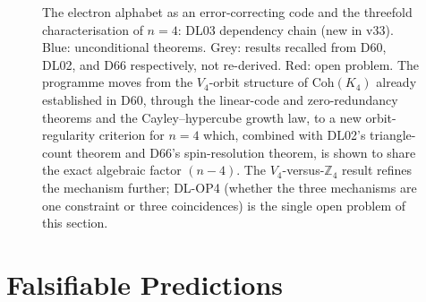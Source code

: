 \documentclass[11pt,a4paper]{article}
\theoremstyle{plain}
\theoremstyle{definition}
\theoremstyle{remark}
\begin{document}
\begin{figure}[H]
{%
}
\caption{The electron alphabet as an error-correcting code and the threefold characterisation of $n=4$: DL03 dependency chain (new in v33). \textcolor{proofblue}{Blue}: unconditional theorems. Grey: results recalled from D60, DL02, and D66 respectively, not re-derived. \textcolor{openproblemred}{Red}: open problem. The programme moves from the $V_4$-orbit structure of $\mathrm{Coh}(K_4)$ already established in D60, through the linear-code and zero-redundancy theorems and the Cayley--hypercube growth law, to a new orbit-regularity criterion for $n=4$ which, combined with DL02's triangle-count theorem and D66's spin-resolution theorem, is shown to share the exact algebraic factor $(n-4)$. The $V_4$-versus-$\mathbb{Z}_4$ result refines the mechanism further; DL-OP4 (whether the three mechanisms are one constraint or three coincidences) is the single open problem of this section.}
\label{fig:dependency_DL03}
\end{figure}

\newpage

\section{Falsifiable Predictions}
\label{sec:predictions}
\end{document}
